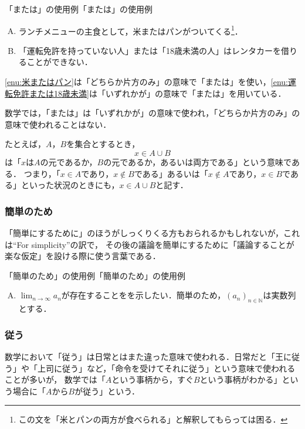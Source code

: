 \documentclass[a4paper,11pt]{ltjsarticle}
\begin{document}
\begin{example}{「または」の使用例}{「または」の使用例}
    \begin{enumerate}[(A)]
	\item ランチメニューの主食として，米またはパンがついてくる\footnote{この文を「米とパンの両方が食べられる」と解釈してもらっては困る．}．\label{enu:米またはパン}
	\item 「運転免許を持っていない人」または「18歳未満の人」はレンタカーを借りることができない． \label{enu:運転免許または18歳未満}
	\end{enumerate}
\ref{enu:米またはパン}は「どちらか片方のみ」の意味で「または」を使い，\ref{enu:運転免許または18歳未満}は「いずれかが」の意味で「または」を用いている．
\end{example}

数学では，「または」は「いずれかが」の意味で使われ，「どちらか片方のみ」の意味で使われることはない．

たとえば，$A$，$B$を集合とするとき，
\[
x \in A \cup B
\]
は「$x$は$A$の元であるか，$B$の元であるか，あるいは両方である」という意味である．
つまり，「$ x \in A$であり，$x \notin  B$である」あるいは「$ x \notin A$であり，$x \in B$である」といった状況のときにも，$x \in A \cup B$と記す．

\subsubsection{簡単のため}

「簡単にするために」のほうがしっくりくる方もおられるかもしれないが，これは``For simplicity''の訳で，
その後の議論を簡単にするために「議論することが楽な仮定」を設ける際に使う言葉である．

\begin{example}{「簡単のため」の使用例}{「簡単のため」の使用例}
    \begin{enumerate}[(A)]
  \item $\lim_{n \to \infty} a_n$が存在することをを示したい．簡単のため，$(a_n)_{n \in \mathbb{N}}$は実数列とする．
  \end{enumerate}
\end{example}

\subsubsection{従う}

数学において「従う」は日常とはまた違った意味で使われる．日常だと「王に従う」や「上司に従う」など，「命令を受けてそれに従う」という意味で使われることが多いが，
数学では「$A$という事柄から，すぐ$B$という事柄がわかる」という場合に「$A$から$B$が従う」という．
\end{document}
